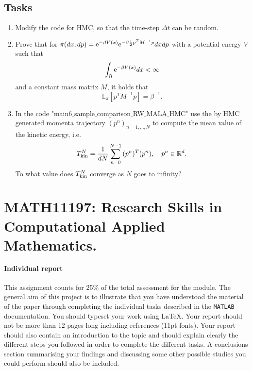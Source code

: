 \documentclass{scrartcl}
\begin{document}
\subsection{Tasks}
\begin{enumerate}
\item Modify the code for HMC, so that the time-step $\Delta t$ can be random.
\item Prove that for $\pi(dx, dp) = {\rm e}^{-\beta V(x)}  {\rm e}^{-\beta \frac{1}{2}p^TM^{-1}p}dxdp $ with a potential energy $V$ such that 
\[
\int_{\Omega} {\rm e}^{-\beta V(x)}dx <\infty
\]
and a constant mass matrix $M$, 
it holds that
\[
\mathbb{E}_{\pi} [p^TM^{-1}p] = \beta^{-1}.
\]
\item In the code "main6$\_$sample$\_$comparison$\_$RW$\_$MALA$\_$HMC" use the by HMC generated momenta trajectory  $(p^n)_{n=1, \ldots, N}$ to compute the mean value of the kinetic energy, i.e.
 \[
 T_{\rm kin}^N = \frac{1}{dN}\sum_{n=0}^{N-1}{(p^n)^T(p^n)}, \quad p^n \in \mathbb{R}^d.
 \]
 To what value does $T_{\rm kin}^N$ converge as $N$ goes to infinity?
\end{enumerate}





\newpage

\section*{MATH11197: Research Skills in Computational Applied Mathematics. }

\paragraph{Individual report}


This assignment counts for 25\% of the total assessment for the 
module. The general aim of this project is to illustrate  that you have 
understood the material of the paper \cite{sanz2014markov} through 
completing the individual tasks described in the \texttt{MATLAB} 
documentation. You should typeset your work using  \LaTeX. Your 
report should not be more than $12$ pages long including references 
(11pt fonts).  Your report should also contain an introduction to the 
topic and should explain clearly the different steps you followed in 
order to complete the different tasks. A conclusions section 
summarising your findings and discussing some other possible studies you could perform should also be included. 
\end{document}
